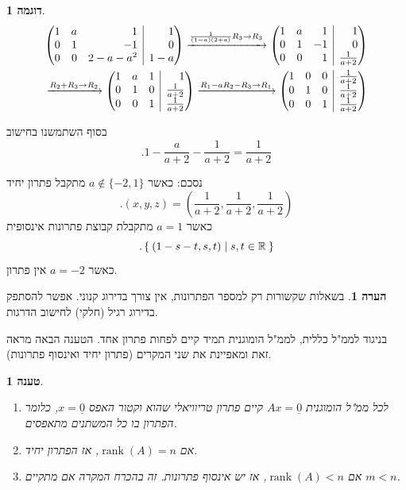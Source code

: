 \documentclass[12pt]{report}
\theoremstyle{plain}
\newtheorem{proposition}[theorem]{טענה}
\theoremstyle{definition}
\newtheorem{example}{דוגמה}[chapter]
\newtheorem{remark}{הערה}[chapter]
\newcommand{\R}{\mathbb{R}}
\DeclareMathOperator{\rank}{rank}
\newcommand{\0}{\mathbf{0}}
\begin{document}
\begin{example}
$$
\begin{aligned}
\left(\begin{array}{@{}rrr|r@{}}
1 & a & 1 & 1 \\
0 & 1 & -1 & 0\\
0 & 0 & 2-a-a^2 & 1-a
\end{array}\right)
\xrightarrow{\frac{1}{(1-a)(2+a)}R_3\to R_3}
\left(\begin{array}{@{}rrr|r@{}}
1 & a & 1 & 1 \\
0 & 1 & -1 & 0\\
0 & 0 & 1 & \frac{1}{a+2}
\end{array}\right) \\
\xrightarrow{R_2+R_3\to R_2} 
\left(\begin{array}{@{}rrr|r@{}}
1 & a & 1 & 1 \\
0 & 1 & 0 & \frac{1}{a+2}\\
0 & 0 & 1 & \frac{1}{a+2}
\end{array}\right)
\xrightarrow{R_1-aR_2-R_3\to R_1} 
\left(\begin{array}{@{}rrr|r@{}}
1 & 0 & 0 & \frac{1}{a+2} \\
0 & 1 & 0 & \frac{1}{a+2}\\
0 & 0 & 1 & \frac{1}{a+2}
\end{array}\right)
\end{aligned}
$$

בסוף השתמשנו בחישוב
$$.1-\frac{a}{a+2}-\frac{1}{a+2}=\frac{1}{a+2}$$

נסכם:
כאשר 
$a\notin\{-2,1\}$
מתקבל פתרון יחיד
$$.(x,y,z)=(\frac{1}{a+2},\frac{1}{a+2},\frac{1}{a+2})$$
כאשר
$a=1$
מתקבלת קבוצת פתרונות אינסופית
$$
.\Set{(1-s-t,s,t)|s,t\in\R}
$$
כאשר
$a=-2$
אין פתרון.
\end{example}

\begin{remark}
בשאלות שקשורות רק למספר הפתרונות, אין צורך בדירוג קנוני. אפשר להסתפק בדירוג רגיל (חלקי) לחישוב הדרגות.
\end{remark}

בניגוד לממ"ל כללית, לממ"ל הומוגנית תמיד קיים לפחות פתרון אחד. הטענה הבאה מראה זאת ומאפיינת את שני המקרים (פתרון יחיד ואינסוף פתרונות).

\begin{proposition}\label{prop:homogeneous}\
\begin{enumerate}[label=\alph*.]
\item
לכל ממ"ל הומוגנית 
$Ax=\underline{0}$
קיים פתרון טריוויאלי שהוא וקטור
האפס
$x=\underline{0}$,
כלומר הפתרון בו כל המשתנים מתאפסים.


\item
אם
$\rank(A)=n$,
אז הפתרון יחיד.


\item
אם
$\rank(A)<n$,
אז יש אינסוף פתרונות. זה בהכרח המקרה אם מתקיים
$m<n$.


\end{enumerate}
\end{proposition}
\end{document}
